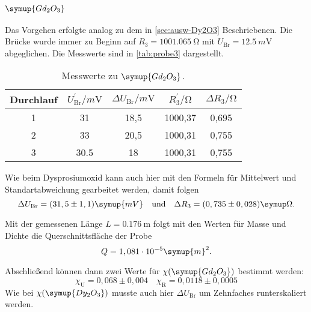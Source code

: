 \subsubsection{$\symup{Gd_2O_3}$}

Das Vorgehen erfolgte analog zu dem in \autoref{sec:ausw-Dy2O3} Beschriebenen. Die Brücke
wurde immer zu Beginn auf $R_3 = \SI{1001.065}{\ohm}$ mit $U_\text{Br} =
\SI{12.5}{m\volt}$ abgeglichen. Die Messwerte sind in \autoref{tab:probe3} dargestellt.

\begin{table}
  \centering
  \caption{Messwerte zu $\symup{Gd_2O_3}$.}
  \label{tab:probe3}
  \begin{tabular}{c c c c c}
  \toprule
  Durchlauf &
  $U_\text{Br}^\prime / \si{m\volt}$ &
  $\Delta U_\text{Br} / \si{m\volt}$ &
  $R_3^\prime / \si{\ohm} $ &
  $\Delta R_3 / \si{\ohm} $ \\
  \midrule
  1 & 31 & 18,5 & 1000,37 & 0,695 \\
  2 & 33 & 20,5 & 1000,31 & 0,755 \\
  3 & 30.5 & 18 & 1000,31 & 0,755 \\
  \bottomrule
  \end{tabular}
\end{table}

Wie beim Dysprosiumoxid kann auch hier mit den Formeln für Mittelwert und
Standartabweichung gearbeitet werden, damit folgen 
\begin{equation}
	\Delta U_\text{Br} = (31,5 \pm 1,1) \symup{mV}
	\quad
	\text{und}
	\quad
	\Delta R_3 = (0,735 \pm 0,028) \symup\Omega.
\end{equation}

Mit der gemessenen Länge $L = \SI{0.176}{\meter}$ folgt mit den Werten für Masse und Dichte
die Querschnittsfläche der Probe
\begin{equation}
	Q = 1,081 \cdot 10^{-5} \symup{m}^2.
\end{equation}

Abschließend können dann zwei Werte für $\chi(\symup{Gd_2O_3})$ bestimmt werden:
\begin{equation}
	\chi_\text{U} = 0,068 \pm 0,004
	\quad
	\chi_\text{R} = 0,0118 \pm 0,0005
\end{equation}
Wie bei $\chi(\symup{Dy_2O_3})$ musste auch hier $\Delta U_\text{Br}$ um Zehnfaches
runterskaliert werden.

